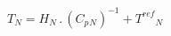\documentclass[border=2pt]{standalone}
\begin{document}
${T}{_{N}}={H}{_{N}} \, . \, \left( {{C_p}}{_{N}} \right)^{-1}  + {{T^{ref}}}{_{N}}$
\end{document}
